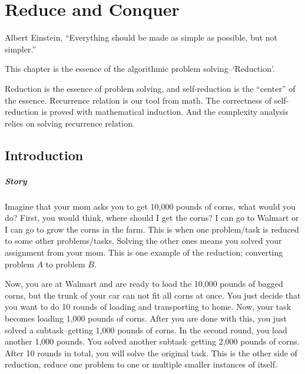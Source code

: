 \documentclass[../main.tex]{subfiles}
\begin{document}
\chapter{Reduce and Conquer}
\label{chapter_divide_conquer}
\begin{chapquote}
{Albert Einstein, }
``Everything should be made as simple as possible, but not simpler.''
\end{chapquote}

This chapter is the essence of the algorithmic problem solving--`Reduction'. 


\begin{importantnote}
Reduction is the essence of problem solving, and self-reduction is the ``center'' of the essence. Recurrence relation is our tool from math. The correctness of self-reduction is proved with mathematical induction. And the complexity analysis relies on solving recurrence relation. 
\end{importantnote}


\section{Introduction}
\paragraph{Story}Imagine that your mom asks you to get 10,000 pounds of corns, what would you do? First, you would think, where should I get the corns? I can go to Walmart or I can go to grow the corns in the farm. This is when one problem/task is reduced to some other problems/tasks. Solving the other ones means you solved your assignment from your mom. This is one example of the reduction; converting  problem  $A$ to problem $B$.

Now, you are at Walmart and are ready to load the 10,000 pounds of bagged corns, but the trunk of your car can not fit all corns at once. You just decide that you want to do 10 rounds of loading and transporting to home. Now, your task becomes loading 1,000 pounds of corns. After you are done with this, you just solved a subtask--getting 1,000 pounds of corns. In the second round, you load another 1,000 pounds. You solved another subtask--getting 2,000 pounds of corns. After 10 rounds in total, you will solve the original task. This is the other side of reduction, reduce one problem to one or multiple smaller instances of itself. 
\end{document}
